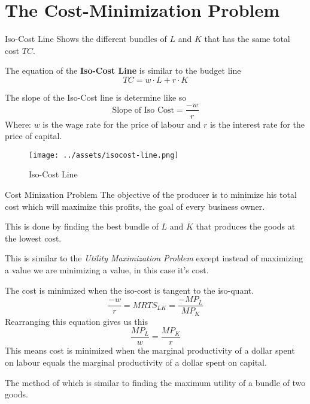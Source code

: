 \documentclass[../ECON-281-Notes.tex]{subfiles}
\begin{document}
\section{The Cost-Minimization Problem}
\begin{Definition}
    {Iso-Cost Line}
    Shows the different bundles of \(L\) and \(K\) that has the same total cost \(TC\).

    The equation of the \textbf{Iso-Cost Line} is similar to the budget line
    \begin{equation}
        TC = w\cdot L + r\cdot K    
    \end{equation}

    The slope of the Iso-Cost line is determine like so
    \begin{equation}
        \text{Slope of Iso Cost} = \frac{-w}{r} 
    \end{equation}
    Where:
    \(w\) is the wage rate for the price of labour and \(r\) is the interest rate for the price of capital.

\end{Definition}

\begin{figure}[h]
    \centering
    \texttt{[image: ../assets/isocost-line.png]}
    \caption{Iso-Cost Line}
    \label{fig:iso_cost_line}
\end{figure}


\begin{DndSidebar}[color=PhbLightGreen]{Cost Minization Problem}
    The objective of the producer is to minimize his total cost which will maximize this profits, the goal of every business owner. 

    This is done by finding the best bundle of \(L\) and \(K\) that produces the goods at the lowest cost.

    This is similar to the \emph{Utility Maximization Problem} except instead of maximizing a value we are minimizing a value, in this case it's cost.
\end{DndSidebar}

The cost is minimized when the iso-cost is tangent to the iso-quant. 
\[
    \frac{-w}{r} = MRTS_{LK} = \frac{-MP_L}{MP_K}
\]
Rearranging this equation gives us this
\[
    \frac{MP_L}{w} = \frac{MP_K}{r}
\]
This means cost is minimized when the marginal productivity of a dollar spent on labour equals the marginal productivity of a dollar spent on capital. 

The method of which is similar to finding the maximum utility of a bundle of two goods. 
\end{document}
